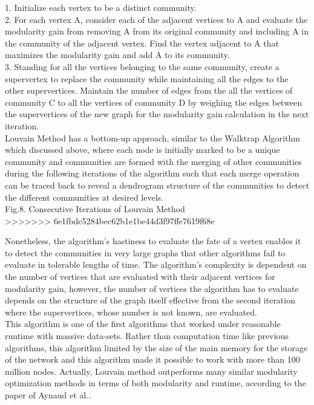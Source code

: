 \documentclass[10pt]{article}
\begin{document}
1. Initialize each vertex to be a distinct community. \\
2. For each vertex A, consider each of the adjacent vertices to A and evaluate the modularity gain from removing A from its original community and including A in the community of the adjacent vertex. Find the vertex adjacent to A that maximizes the modularity gain and add A to its community. \\
3. Standing for all the vertices belonging to the same community, create a supervertex to replace the community while maintaining all the edges to the other supervertices. Maintain the number of edges from the all the vertices of community C to all the vertices of community D by weighing the edges between the supervertices of the new graph for the modularity gain calculation in the next iteration. \\

Louvain Method has a bottom-up approach, similar to the Walktrap Algorithm which discussed above, where each node is initially marked to be a unique community and communities are formed with the merging of other communities during the following iterations of the algorithm such that each merge operation can be traced back to reveal a dendrogram structure of the communities to detect the different communities at desired levels. \\

Fig.8. Consecutive Iterations of Louvain Method\cite{blondel} \\
>>>>>>> 6e1fbdc5284bec62b1e1be44d3f97ffe7619f68e

Nonetheless, the algorithm’s hastiness to evaluate the fate of a vertex enables it to detect the communities in very large graphs that other algorithms fail to evaluate in tolerable lengths of time. The algorithm’s complexity is dependent on the number of vertices that are evaluated with their adjacent vertices for modularity gain, however, the number of vertices the algorithm has to evaluate depends on the structure of the graph itself effective from the second iteration where the supervertices, whose number is not known, are evaluated. \\

This algorithm is one of the first algorithms that worked under reasonable runtime with massive data-sets. Rather than computation time like previous algorithms, this algorithm limited by the size of the main memory for the storage of the network and this algorithm made it possible to work with more than 100 million nodes. Actually, Louvain method outperforms many similar modularity optimization methods in terms of both modularity and runtime, according to the paper of Aynaud et al.\cite{french}. \\
\end{document}
